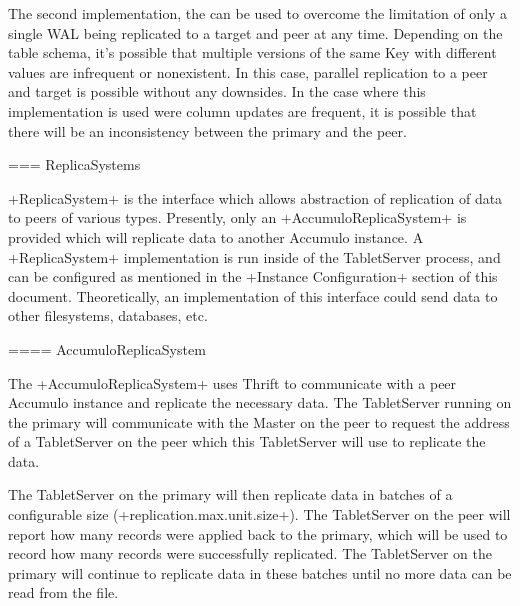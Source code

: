The second implementation, the  can be used to overcome the limitation
of only a single WAL being replicated to a target and peer at any time. Depending on the table schema,
it's possible that multiple versions of the same Key with different values are infrequent or nonexistent.
In this case, parallel replication to a peer and target is possible without any downsides. In the case
where this implementation is used were column updates are frequent, it is possible that there will be
an inconsistency between the primary and the peer.

=== ReplicaSystems

+ReplicaSystem+ is the interface which allows abstraction of replication of data
to peers of various types. Presently, only an +AccumuloReplicaSystem+ is provided
which will replicate data to another Accumulo instance. A +ReplicaSystem+ implementation
is run inside of the TabletServer process, and can be configured as mentioned in the 
+Instance Configuration+ section of this document. Theoretically, an implementation
of this interface could send data to other filesystems, databases, etc.

==== AccumuloReplicaSystem

The +AccumuloReplicaSystem+ uses Thrift to communicate with a peer Accumulo instance
and replicate the necessary data. The TabletServer running on the primary will communicate
with the Master on the peer to request the address of a TabletServer on the peer which
this TabletServer will use to replicate the data.

The TabletServer on the primary will then replicate data in batches of a configurable
size (+replication.max.unit.size+). The TabletServer on the peer will report how many
records were applied back to the primary, which will be used to record how many records
were successfully replicated. The TabletServer on the primary will continue to replicate
data in these batches until no more data can be read from the file.
